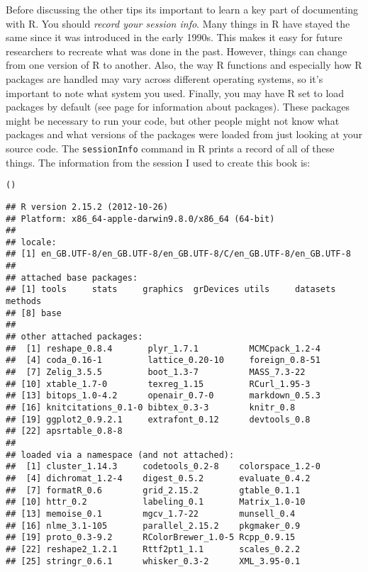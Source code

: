 {Before discussing the other tips its important to learn a key part of documenting with R. You should \emph{record your session info}. Many things in R have stayed the same since it was introduced in the early 1990s. This makes it easy for future researchers to recreate what was done in the past. However, things can change from one version of R to another. Also, the way R functions and especially how R packages are handled may vary across different operating systems, so it's important to note what system you used. Finally, you may have R set to load packages by default (see page \pageref{Packages} for information about packages). These packages might be necessary to run your code, but other people might not know what packages and what versions of the packages were loaded from just looking at your source code. The \texttt{sessionInfo} command in R prints a record of all of these things. The information from the session I used to create this book is:

{\footnotesize{
\begin{knitrout}
\color{fgcolor}\begin{kframe}
\begin{alltt}
()
\end{alltt}
\begin{verbatim}
## R version 2.15.2 (2012-10-26)
## Platform: x86_64-apple-darwin9.8.0/x86_64 (64-bit)
## 
## locale:
## [1] en_GB.UTF-8/en_GB.UTF-8/en_GB.UTF-8/C/en_GB.UTF-8/en_GB.UTF-8
## 
## attached base packages:
## [1] tools     stats     graphics  grDevices utils     datasets  methods  
## [8] base     
## 
## other attached packages:
##  [1] reshape_0.8.4       plyr_1.7.1          MCMCpack_1.2-4     
##  [4] coda_0.16-1         lattice_0.20-10     foreign_0.8-51     
##  [7] Zelig_3.5.5         boot_1.3-7          MASS_7.3-22        
## [10] xtable_1.7-0        texreg_1.15         RCurl_1.95-3       
## [13] bitops_1.0-4.2      openair_0.7-0       markdown_0.5.3     
## [16] knitcitations_0.1-0 bibtex_0.3-3        knitr_0.8          
## [19] ggplot2_0.9.2.1     extrafont_0.12      devtools_0.8       
## [22] apsrtable_0.8-8    
## 
## loaded via a namespace (and not attached):
##  [1] cluster_1.14.3     codetools_0.2-8    colorspace_1.2-0  
##  [4] dichromat_1.2-4    digest_0.5.2       evaluate_0.4.2    
##  [7] formatR_0.6        grid_2.15.2        gtable_0.1.1      
## [10] httr_0.2           labeling_0.1       Matrix_1.0-10     
## [13] memoise_0.1        mgcv_1.7-22        munsell_0.4       
## [16] nlme_3.1-105       parallel_2.15.2    pkgmaker_0.9      
## [19] proto_0.3-9.2      RColorBrewer_1.0-5 Rcpp_0.9.15       
## [22] reshape2_1.2.1     Rttf2pt1_1.1       scales_0.2.2      
## [25] stringr_0.6.1      whisker_0.3-2      XML_3.95-0.1
\end{verbatim}
\end{kframe}
\end{knitrout}

}}}

